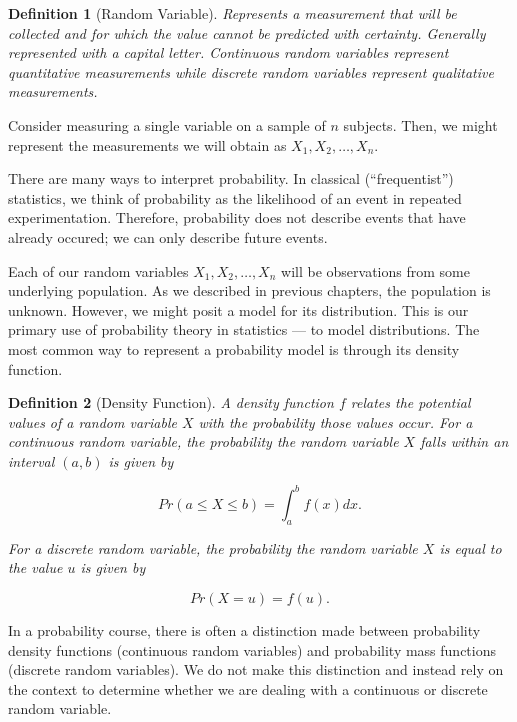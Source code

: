 \documentclass[
]{book}
\theoremstyle{plain}
\theoremstyle{mydefn}
\newtheorem{definition}{Definition}[chapter]
\theoremstyle{myexmpl}
\theoremstyle{remark}
\begin{document}
\begin{definition}[Random Variable]
Represents a measurement that will be collected and for which the value cannot be predicted with certainty. Generally represented with a capital letter. Continuous random variables represent quantitative measurements while discrete random variables represent qualitative measurements.
\end{definition}

Consider measuring a single variable on a sample of \(n\) subjects. Then, we might represent the measurements we will obtain as \(X_1, X_2, \dots, X_n\).

\begin{rmdtip}
There are many ways to interpret probability. In classical (``frequentist'') statistics, we think of probability as the likelihood of an event in repeated experimentation. Therefore, probability does not describe events that have already occured; we can only describe future events.\\
\end{rmdtip}

Each of our random variables \(X_1, X_2, \dotsc, X_n\) will be observations from some underlying population. As we described in previous chapters, the population is unknown. However, we might posit a model for its distribution. This is our primary use of probability theory in statistics --- to model distributions. The most common way to represent a probability model is through its density function.

\begin{definition}[Density Function]
A density function \(f\) relates the potential values of a random variable \(X\) with the probability those values occur. For a \emph{continuous} random variable, the probability the random variable \(X\) falls within an interval \((a, b)\) is given by

\[Pr(a \leq X \leq b) = \int_{a}^{b} f(x) dx.\]

For a \emph{discrete} random variable, the probability the random variable \(X\) is equal to the value \(u\) is given by

\[Pr(X = u) = f(u).\]
\end{definition}

\begin{rmdtip}
In a probability course, there is often a distinction made between probability density functions (continuous random variables) and probability mass functions (discrete random variables). We do not make this distinction and instead rely on the context to determine whether we are dealing with a continuous or discrete random variable.
\end{rmdtip}
\end{document}
